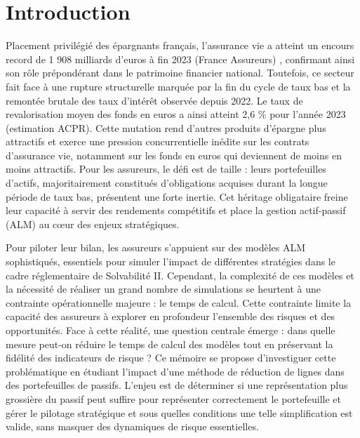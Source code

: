 \chapter*{Introduction}

Placement privilégié des épargnants français, l'assurance vie a atteint un encours record de 1 908 milliards d'euros à fin 2023 (France Assureurs) \cite{france_assureurs}, confirmant ainsi son rôle prépondérant dans le patrimoine financier national. Toutefois, ce secteur fait face à une rupture structurelle marquée par la fin du cycle de taux bas et la remontée brutale des taux d'intérêt observée depuis 2022. Le taux de revalorisation moyen des fonds en euros a ainsi atteint 2,6 \% pour l'année 2023 (estimation ACPR). Cette mutation rend d'autres produits d'épargne plus attractifs et exerce une pression concurrentielle inédite sur les contrats d'assurance vie, notamment sur les fonds en euros qui deviennent de moins en moins attractifs. Pour les assureurs, le défi est de taille : leurs portefeuilles d'actifs, majoritairement constitués d'obligations acquises durant la longue période de taux bas, présentent une forte inertie. Cet héritage obligataire freine leur capacité à servir des rendements compétitifs et place la gestion actif-passif (ALM) au cœur des enjeux stratégiques.

Pour piloter leur bilan, les assureurs s'appuient sur des modèles ALM sophistiqués, essentiels pour simuler l'impact de différentes stratégies dans le cadre réglementaire de Solvabilité II. Cependant, la complexité de ces modèles et la nécessité de réaliser un grand nombre de simulations se heurtent à une contrainte opérationnelle majeure : le temps de calcul. Cette contrainte limite la capacité des assureurs à explorer en profondeur l'ensemble des risques et des opportunités. Face à cette réalité, une question centrale émerge : dans quelle mesure peut-on réduire le temps de calcul des modèles tout en préservant la fidélité des indicateurs de risque ? Ce mémoire se propose d'investiguer cette problématique en étudiant l'impact d'une méthode de réduction de lignes dans des portefeuilles de passifs. L'enjeu est de déterminer si une représentation plus grossière du passif peut suffire pour représenter correctement le portefeuille et gérer le pilotage stratégique et sous quelles conditions une telle simplification est valide, sans masquer des dynamiques de risque essentielles.

